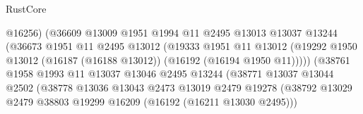 \begin{lexlean}{RustCore}
\begin{coremodule}
                                          @16256)
                                        (@36609
                                          @13009
                                          @1951
                                          @1994
                                          @11
                                          @2495
                                          @13013
                                          @13037
                                          @13244
                                          (@36673
                                            @1951
                                            @11
                                            @2495
                                            @13012
                                            (@19333
                                              @1951
                                              @11
                                              @13012
                                              (@19292
                                                @1950
                                                @13012
                                                (@16187 (@16188 @13012))
                                                (@16192 (@16194 @1950 @11)))))
                                          (@38761
                                            @1958
                                            @1993
                                            @11
                                            @13037
                                            @13046
                                            @2495
                                            @13244
                                            (@38771
                                              @13037
                                              @13044
                                              @2502
                                              (@38778
                                                @13036
                                                @13043
                                                @2473
                                                @13019
                                                @2479
                                                @19278
                                                (@38792
                                                  @13029
                                                  @2479
                                                  @38803
                                                  @19299
                                                  @16209
                                                  (@16192 (@16211 @13030 @2495)))

\end{coremodule}
\end{lexlean}
